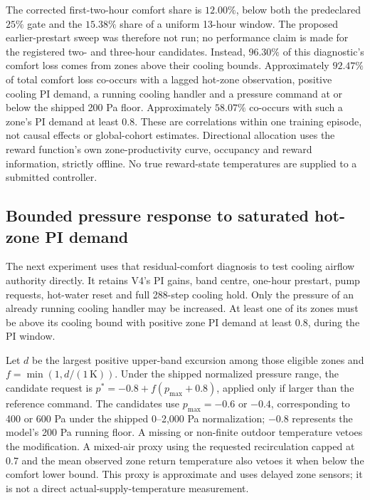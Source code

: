 The corrected first-two-hour comfort share is $12.00\%$, below both the
predeclared $25\%$ gate and the $15.38\%$ share of a uniform 13-hour window.
The proposed earlier-prestart sweep was therefore not run; no performance
claim is made for the registered two- and three-hour candidates. Instead,
$96.30\%$ of this diagnostic's comfort loss comes from zones above their
cooling bounds. Approximately $92.47\%$ of total comfort loss co-occurs with
a lagged hot-zone observation, positive cooling PI demand, a running cooling
handler and a pressure command at or below the shipped 200 Pa floor.
Approximately $58.07\%$ co-occurs with such a zone's PI demand at least 0.8.
These are correlations within one training episode, not causal effects or
global-cohort estimates. Directional allocation uses the reward function's own
zone-productivity curve, occupancy and reward information, strictly offline.
No true reward-state temperatures are supplied to a submitted controller.



\subsection{Bounded pressure response to saturated hot-zone PI demand}
The next experiment uses that residual-comfort diagnosis to test cooling
airflow authority directly. It retains V4's PI gains, band centre, one-hour
prestart, pump requests, hot-water reset and full 288-step cooling hold.
Only the pressure of an already running cooling handler may be increased.
At least one of its zones must be above its cooling bound with positive
zone PI demand at least 0.8, during the PI window.

Let $d$ be the largest positive upper-band excursion among those eligible
zones and $f=\min(1,d/(1\,\mathrm{K}))$. Under the shipped normalized pressure
range, the candidate request is
$p^*=-0.8+f(p_{\max}+0.8)$, applied only if larger than the reference command.
The candidates use $p_{\max}=-0.6$ or $-0.4$, corresponding to 400 or 600 Pa
under the shipped 0--2,000 Pa normalization; $-0.8$ represents the model's
200 Pa running floor. A missing or non-finite outdoor temperature vetoes
the modification. A mixed-air proxy using the requested recirculation capped
at 0.7 and the mean observed zone return temperature also vetoes it when below
the comfort lower bound. This proxy is approximate and uses delayed zone
sensors; it is not a direct actual-supply-temperature measurement.


